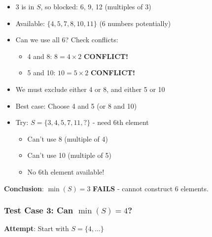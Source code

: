 \documentclass[12pt]{article}
\begin{document}
\begin{conversionbox}
\begin{itemize}
    \item 3 is in $S$, so blocked: 6, 9, 12 (multiples of 3)
    \item Available: $\{4, 5, 7, 8, 10, 11\}$ (6 numbers potentially)
    \item Can we use all 6? Check conflicts:
    \begin{itemize}
        \item 4 and 8: $8 = 4 \times 2$ \textbf{CONFLICT!}
        \item 5 and 10: $10 = 5 \times 2$ \textbf{CONFLICT!}
    \end{itemize}
    \item We must exclude either 4 or 8, and either 5 or 10
    \item Best case: Choose 4 and 5 (or 8 and 10)
    \item Try: $S = \{3, 4, 5, 7, 11, ?\}$ - need 6th element
    \begin{itemize}
        \item Can't use 8 (multiple of 4)
        \item Can't use 10 (multiple of 5)
        \item No 6th element available!
    \end{itemize}
\end{itemize}

\textbf{Conclusion}: $\min(S) = 3$ \textbf{FAILS} - cannot construct 6 elements.

\subsubsection*{Test Case 3: Can $\min(S) = 4$?}

\textbf{Attempt}: Start with $S = \{4, \ldots\}$


\end{conversionbox}
\end{document}
